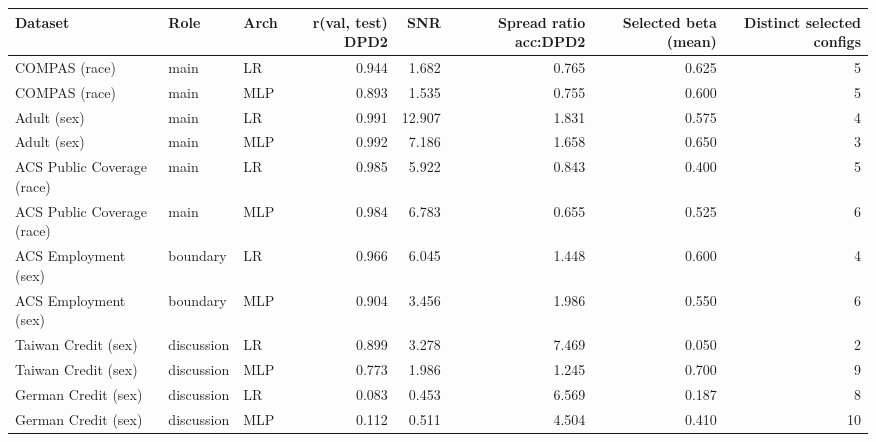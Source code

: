 \begin{tabular}{lllrrrrr}
\toprule
Dataset & Role & Arch & r(val, test) DPD2 & SNR & Spread ratio acc:DPD2 & Selected beta (mean) & Distinct selected configs \\
\midrule
COMPAS (race) & main & LR & 0.944 & 1.682 & 0.765 & 0.625 & 5 \\
COMPAS (race) & main & MLP & 0.893 & 1.535 & 0.755 & 0.600 & 5 \\
Adult (sex) & main & LR & 0.991 & 12.907 & 1.831 & 0.575 & 4 \\
Adult (sex) & main & MLP & 0.992 & 7.186 & 1.658 & 0.650 & 3 \\
ACS Public Coverage (race) & main & LR & 0.985 & 5.922 & 0.843 & 0.400 & 5 \\
ACS Public Coverage (race) & main & MLP & 0.984 & 6.783 & 0.655 & 0.525 & 6 \\
ACS Employment (sex) & boundary & LR & 0.966 & 6.045 & 1.448 & 0.600 & 4 \\
ACS Employment (sex) & boundary & MLP & 0.904 & 3.456 & 1.986 & 0.550 & 6 \\
Taiwan Credit (sex) & discussion & LR & 0.899 & 3.278 & 7.469 & 0.050 & 2 \\
Taiwan Credit (sex) & discussion & MLP & 0.773 & 1.986 & 1.245 & 0.700 & 9 \\
German Credit (sex) & discussion & LR & 0.083 & 0.453 & 6.569 & 0.187 & 8 \\
German Credit (sex) & discussion & MLP & 0.112 & 0.511 & 4.504 & 0.410 & 10 \\
\bottomrule
\end{tabular}
